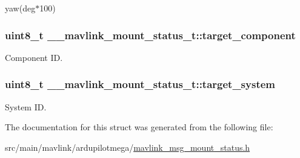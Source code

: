 yaw(deg$\ast$100) 

\hypertarget{struct____mavlink__mount__status__t_a101b36e939ec924ce415e80e9b0d8f1e}{
\subsubsection[{target\+\_\+component}]{\setlength{\rightskip}{0pt plus 5cm}uint8\+\_\+t \+\_\+\+\_\+mavlink\+\_\+mount\+\_\+status\+\_\+t\+::target\+\_\+component}}\label{struct____mavlink__mount__status__t_a101b36e939ec924ce415e80e9b0d8f1e}


Component I\+D. 

\hypertarget{struct____mavlink__mount__status__t_a22c9048f29da5622b7c97edfd5801ac9}{
\subsubsection[{target\+\_\+system}]{\setlength{\rightskip}{0pt plus 5cm}uint8\+\_\+t \+\_\+\+\_\+mavlink\+\_\+mount\+\_\+status\+\_\+t\+::target\+\_\+system}}\label{struct____mavlink__mount__status__t_a22c9048f29da5622b7c97edfd5801ac9}


System I\+D. 



The documentation for this struct was generated from the following file\+:\begin{DoxyCompactItemize}
\item 
src/main/mavlink/ardupilotmega/\hyperlink{mavlink__msg__mount__status_8h}{mavlink\+\_\+msg\+\_\+mount\+\_\+status.\+h}\end{DoxyCompactItemize}
